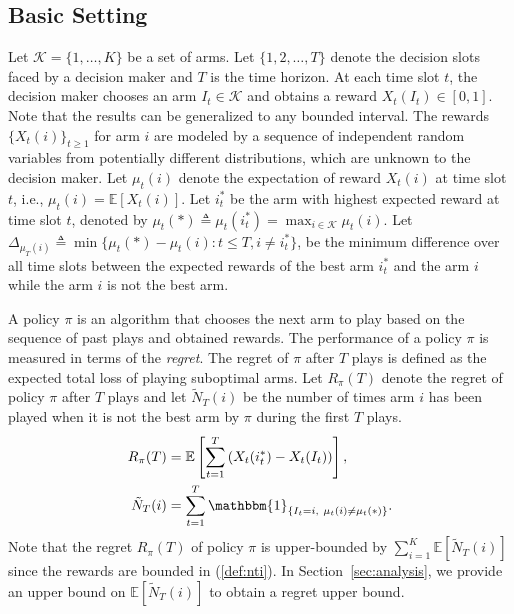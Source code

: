 \documentclass[letterpaper]{article}
\begin{document}
\subsection{Basic Setting}
Let $\mathcal{K}=\{1,\ldots,K\}$ be a set of arms. Let $\{1,2,\ldots,T\}$ denote the decision slots faced by a decision maker and $T$ is the time horizon. At each time slot $t$, the decision maker chooses an arm $I_t\in\mathcal{K}$ and obtains a reward $X_t(I_t)\in[0,1]$. Note that the results can be generalized to any bounded interval. The rewards $\{X_t(i)\}_{t\geq1}$ for arm $i$ are modeled by a sequence of independent random variables from potentially different distributions, which are unknown to the decision maker.
Let $\mu_t(i)$ denote the expectation of reward $X_t(i)$ at time slot $t$, i.e., $\mu_t(i)=\mathbb{E}[X_t(i)]$. Let $i^*_t$ be the arm with highest expected reward at time slot $t$, denoted by $\mu_t(*)\triangleq\mu_t(i^*_t)=\max_{i\in\mathcal{K}}\mu_t(i)$.
Let $\Delta_{\mu_T(i)}\triangleq\min\{\mu_t(*)-\mu_t(i):t\leq T, i\neq i^*_t\}$, be the minimum difference over all time slots between the expected rewards of the best arm $i^*_t$ and the arm $i$ while the arm $i$ is not the best arm. %

A policy $\pi$ is an algorithm that chooses the next arm to play based on the sequence of past plays and obtained rewards. The performance of a policy $\pi$ is measured in terms of the \emph{regret}. The regret of $\pi$ after $T$ plays is defined as the expected total loss of playing suboptimal arms. Let $R_\pi(T)$ denote the regret of policy $\pi$ after $T$ plays and let $\tilde{N}_T(i)$ be the number of times arm $i$ has been played when it is not the best arm by $\pi$ during the first $T$ plays.
\begin{align}\label{def:nti}
R_\pi(T)&=\mathbb{E}\left[\sum_{t=1}^T\left(X_t(i^*_t)-X_t(I_t)\right)\right],\\
\tilde{N}_T(i)&=\sum_{t=1}^T\mathbbm{1}_{\left\{I_t=i,~\mu_t(i)\neq \mu_t(*)\right\}}.
\end{align}
Note that the regret $R_\pi(T)$ of policy $\pi$ is upper-bounded by $\sum_{i=1}^K\mathbb{E}[\tilde{N}_T(i)]$ since the rewards are bounded in (\ref{def:nti}).
In Section~\ref{sec:analysis}, we provide an upper bound on $\mathbb{E}[\tilde{N}_T(i)]$ to obtain a regret upper bound.
\end{document}
